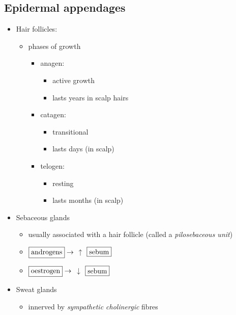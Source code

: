 \documentclass[
  12pt,
]{memoir}
\providecommand{\tightlist}{%
  \setlength{\itemsep}{0pt}\setlength{\parskip}{0pt}}
\begin{document}
\hypertarget{epidermal-appendages}{%
\subsection{Epidermal appendages}\label{epidermal-appendages}}

\begin{itemize}
\tightlist
\item
  Hair follicles:

  \begin{itemize}
  \tightlist
  \item
    phases of growth

    \begin{itemize}
    \tightlist
    \item
      anagen:

      \begin{itemize}
      \tightlist
      \item
        active growth
      \item
        lasts years in scalp hairs
      \end{itemize}
    \item
      catagen:

      \begin{itemize}
      \tightlist
      \item
        transitional
      \item
        lasts days (in scalp)
      \end{itemize}
    \item
      telogen:

      \begin{itemize}
      \tightlist
      \item
        resting
      \item
        lasts months (in scalp)
      \end{itemize}
    \end{itemize}
  \end{itemize}
\item
  Sebaceous glands

  \begin{itemize}
  \tightlist
  \item
    usually associated with a hair follicle (called a
    \emph{pilosebaceous unit})
  \item
    \(\fbox{androgens}\rightarrow\) \textbf{\(\uparrow\)}
    \(\fbox{sebum}\)
  \item
    \(\fbox{oestrogen}\rightarrow\) \textbf{\(\downarrow\)}
    \(\fbox{sebum}\)
  \end{itemize}
\item
  Sweat glands

  \begin{itemize}
  \tightlist
  \item
    innerved by \emph{sympathetic cholinergic} fibres
  \end{itemize}
\end{itemize}
\end{document}
